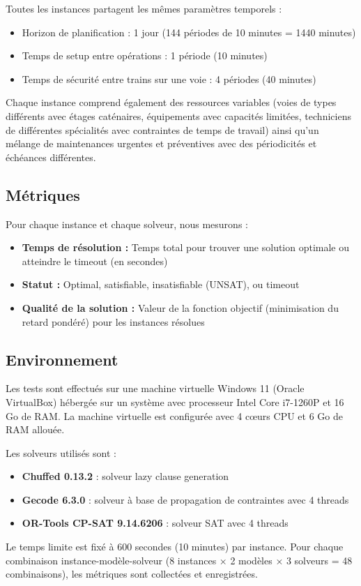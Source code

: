Toutes les instances partagent les mêmes paramètres temporels :
\begin{itemize}
	\item Horizon de planification : 1 jour (144 périodes de 10 minutes = 1440 minutes)
	\item Temps de setup entre opérations : 1 période (10 minutes)
	\item Temps de sécurité entre trains sur une voie : 4 périodes (40 minutes)
\end{itemize}

Chaque instance comprend également des ressources variables (voies de types différents avec étages caténaires, équipements avec capacités limitées, techniciens de différentes spécialités avec contraintes de temps de travail) ainsi qu'un mélange de maintenances urgentes et préventives avec des périodicités et échéances différentes.

\subsection{Métriques}

Pour chaque instance et chaque solveur, nous mesurons :
\begin{itemize}
	\item \textbf{Temps de résolution :} Temps total pour trouver une solution optimale ou atteindre le timeout (en secondes)
	\item \textbf{Statut :} Optimal, satisfiable, insatisfiable (UNSAT), ou timeout
	\item \textbf{Qualité de la solution :} Valeur de la fonction objectif (minimisation du retard pondéré) pour les instances résolues
\end{itemize}

\subsection{Environnement}

Les tests sont effectués sur une machine virtuelle Windows 11 (Oracle VirtualBox) hébergée sur un système avec processeur Intel Core i7-1260P et 16 Go de RAM. La machine virtuelle est configurée avec 4 cœurs CPU et 6 Go de RAM allouée.

Les solveurs utilisés sont :
\begin{itemize}
	\item \textbf{Chuffed 0.13.2} : solveur lazy clause generation
	\item \textbf{Gecode 6.3.0} : solveur à base de propagation de contraintes avec 4 threads
	\item \textbf{OR-Tools CP-SAT 9.14.6206} : solveur SAT avec 4 threads
\end{itemize}

Le temps limite est fixé à 600 secondes (10 minutes) par instance. Pour chaque combinaison instance-modèle-solveur (8 instances × 2 modèles × 3 solveurs = 48 combinaisons), les métriques sont collectées et enregistrées.
